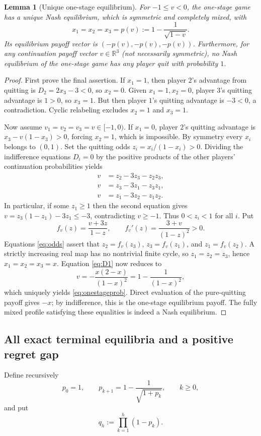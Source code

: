 \documentclass[11pt,a4paper]{article}
\numberwithin{equation}{section}
\theoremstyle{plain}
\newtheorem{lemma}[theorem]{Lemma}
\theoremstyle{definition}
\theoremstyle{remark}
\newcommand{\R}{\mathbb R}
\begin{document}
\begin{lemma}[Unique one-stage equilibrium]\label{lem:onestage}
For $-1\le v<0$, the one-stage game has a unique Nash equilibrium,
which is symmetric and completely mixed, with
\begin{equation}\label{eq:onestageprob}
 x_1=x_2=x_3=p(v):=1-\frac1{\sqrt{1-v}}.
\end{equation}
Its equilibrium payoff vector is $(-p(v),-p(v),-p(v))$.
Furthermore, for \emph{any} continuation payoff vector $v\in\R^3$
(not necessarily symmetric), no Nash equilibrium of the one-stage
game has any player quit with probability $1$.
\end{lemma}
\begin{proof}
First prove the final assertion. If $x_1=1$, then player $2$'s
advantage from quitting is $D_2=2x_3-3<0$, so $x_2=0$.
Given $x_1=1,x_2=0$, player $3$'s quitting advantage is $1>0$, so
$x_3=1$. But then player $1$'s quitting advantage is $-3<0$,
a contradiction. Cyclic relabeling excludes $x_2=1$ and $x_3=1$.

Now assume $v_1=v_2=v_3=v\in[-1,0)$. If $x_1=0$, player $2$'s
quitting advantage is $x_3-v(1-x_3)>0$, forcing $x_2=1$, which is
impossible. By symmetry every $x_i$ belongs to $(0,1)$.
Set the quitting odds $z_i=x_i/(1-x_i)>0$. Dividing the
indifference equations $D_i=0$ by the positive products of the other
players' continuation probabilities yields
\begin{align}\label{eq:odds}
 v&=z_2-3z_3-z_2z_3,\\
 v&=z_3-3z_1-z_3z_1,\nonumber\\
 v&=z_1-3z_2-z_1z_2.\nonumber
\end{align}
In particular, if some $z_1\ge1$ then the second equation gives
$v=z_3(1-z_1)-3z_1\le-3$, contradicting $v\ge-1$.
Thus $0<z_i<1$ for all $i$. Put
\[
 f_v(z)=\frac{v+3z}{1-z},\qquad f_v'(z)=\frac{3+v}{(1-z)^2}>0.
\]
Equations \eqref{eq:odds} assert that
$z_2=f_v(z_3)$, $z_3=f_v(z_1)$, and $z_1=f_v(z_2)$.
A strictly increasing real map has no nontrivial finite cycle, so
$z_1=z_2=z_3$, hence $x_1=x_2=x_3=x$.
Equation \eqref{eq:D1} now reduces to
\[
 v=-\frac{x(2-x)}{(1-x)^2}=1-\frac1{(1-x)^2},
\]
which uniquely yields \eqref{eq:onestageprob}. Direct evaluation of
the pure-quitting payoff gives $-x$; by indifference, this is the
one-stage equilibrium payoff. The fully mixed profile satisfying these
equalities is indeed a Nash equilibrium.
\end{proof}

\subsection{All exact terminal equilibria and a positive regret gap}
Define recursively
\begin{equation}\label{eq:p-rec}
 p_0=1,\qquad
 p_{k+1}=1-\frac1{\sqrt{1+p_k}},\qquad k\ge0,
\end{equation}
and put
\begin{equation}\label{eq:qrec}
 q_h:=\prod_{k=1}^{h}(1-p_k).
\end{equation}
\end{document}
